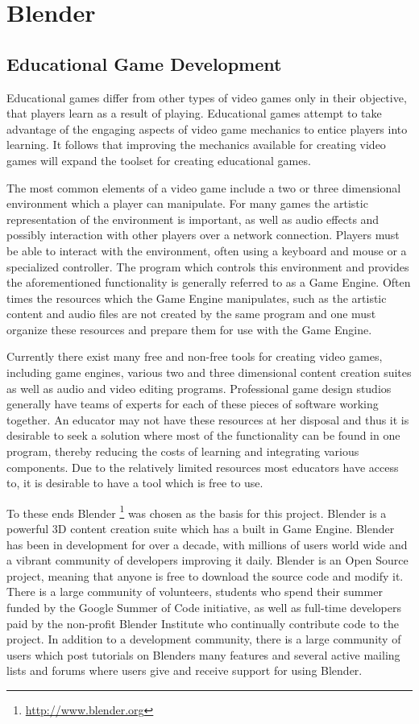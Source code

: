 \chapter{Blender}

\section{Educational Game Development}
Educational games differ from other types of video games only in their
objective, that players learn as a result of playing. Educational games attempt
to take advantage of the engaging aspects of video game mechanics to entice
players into learning. It follows that improving the mechanics available for
creating video games will expand the toolset for creating educational games.


The most common elements of a video game include a two or three dimensional
environment which a player can manipulate. For many games the artistic
representation of the environment is important, as well as audio effects and
possibly interaction with other players over a network connection. Players must
be able to interact with the environment, often using a keyboard and mouse or a
specialized controller. The program which controls this environment and
provides the aforementioned functionality is generally referred to as a Game
Engine. Often times the resources which the Game Engine manipulates, such as
the artistic content and audio files are not created by the same program and
one must organize these resources and prepare them for use with the Game
Engine.


Currently there exist many free and non-free tools for creating video games,
including game engines, various two and three dimensional content creation
suites as well as audio and video editing programs. Professional game design
studios generally have teams of experts for each of these pieces of software
working together. An educator may not have these resources at her disposal and
thus it is desirable to seek a solution where most of the functionality can be
found in one program, thereby reducing the costs of learning and integrating
various components. Due to the relatively limited resources most educators have
access to, it is desirable to have a tool which is free to use. 


To these ends Blender \footnote{\url{http://www.blender.org}} was chosen as the basis for this project.
Blender is a powerful 3D content creation suite which has a built in Game
Engine. Blender has been in development for over a decade, with millions of
users world wide and a vibrant community of developers improving it daily.
Blender is an Open Source project, meaning that anyone is free to download the
source code and modify it. There is a large community of volunteers, students
who spend their summer funded by the Google Summer of Code initiative, as well
as full-time developers paid by the non-profit Blender Institute who
continually contribute code to the project. In addition to a development
community, there is a large community of users which post tutorials on Blenders
many features and several active mailing lists and forums where users give and
receive support for using Blender.



